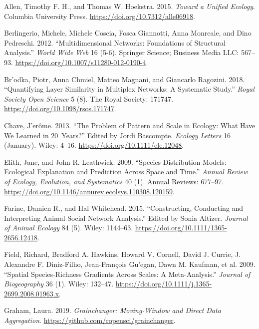 \documentclass[]{article}
\begin{document}
\hypertarget{refs}{}
\leavevmode\hypertarget{ref-Allen_2015}{}%
Allen, Timothy F. H., and Thomas W. Hoekstra. 2015. \emph{Toward a Unified Ecology}. Columbia University Press. \url{https://doi.org/10.7312/alle06918}.

\leavevmode\hypertarget{ref-Berlingerio_2012}{}%
Berlingerio, Michele, Michele Coscia, Fosca Giannotti, Anna Monreale, and Dino Pedreschi. 2012. ``Multidimensional Networks: Foundations of Structural Analysis.'' \emph{World Wide Web} 16 (5-6). Springer Science; Business Media LLC: 567--93. \url{https://doi.org/10.1007/s11280-012-0190-4}.

\leavevmode\hypertarget{ref-Br_dka_2018}{}%
Br\a'odka, Piotr, Anna Chmiel, Matteo Magnani, and Giancarlo Ragozini. 2018. ``Quantifying Layer Similarity in Multiplex Networks: A Systematic Study.'' \emph{Royal Society Open Science} 5 (8). The Royal Society: 171747. \url{https://doi.org/10.1098/rsos.171747}.

\leavevmode\hypertarget{ref-Chave_2013}{}%
Chave, J\a'erôme. 2013. ``The Problem of Pattern and Scale in Ecology: What Have We Learned in 20~Years?'' Edited by Jordi Bascompte. \emph{Ecology Letters} 16 (January). Wiley: 4--16. \url{https://doi.org/10.1111/ele.12048}.

\leavevmode\hypertarget{ref-Elith_2009}{}%
Elith, Jane, and John R. Leathwick. 2009. ``Species Distribution Models: Ecological Explanation and Prediction Across Space and Time.'' \emph{Annual Review of Ecology, Evolution, and Systematics} 40 (1). Annual Reviews: 677--97. \url{https://doi.org/10.1146/annurev.ecolsys.110308.120159}.

\leavevmode\hypertarget{ref-Farine_2015}{}%
Farine, Damien R., and Hal Whitehead. 2015. ``Constructing, Conducting and Interpreting Animal Social Network Analysis.'' Edited by Sonia Altizer. \emph{Journal of Animal Ecology} 84 (5). Wiley: 1144--63. \url{https://doi.org/10.1111/1365-2656.12418}.

\leavevmode\hypertarget{ref-Field_2009}{}%
Field, Richard, Bradford A. Hawkins, Howard V. Cornell, David J. Currie, J. Alexandre F. Diniz-Filho, Jean-François Gu\a'egan, Dawn M. Kaufman, et al. 2009. ``Spatial Species-Richness Gradients Across Scales: A Meta-Analysis.'' \emph{Journal of Biogeography} 36 (1). Wiley: 132--47. \url{https://doi.org/10.1111/j.1365-2699.2008.01963.x}.

\leavevmode\hypertarget{ref-Graham_2019}{}%
Graham, Laura. 2019. \emph{Grainchanger: Moving-Window and Direct Data Aggregation}. \url{https://github.com/ropensci/grainchanger}.
\end{document}
